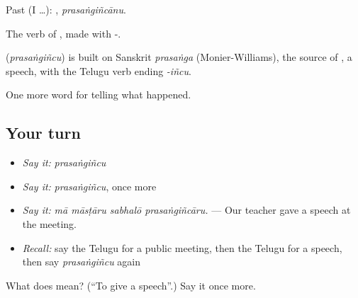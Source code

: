 Past (I …): , \emph{prasaṅgiñcānu}.

The verb of , made with -.

\begin{cousinweb}
\textbf{} (\emph{prasaṅgiñcu}) is built on Sanskrit \emph{prasaṅga} (Monier-Williams), the source of , a speech, with the Telugu verb ending \emph{-iñcu}.
\end{cousinweb}

\begin{grammarlens}[title={What you've built}]
One more word for telling what happened.
\end{grammarlens}

\subsection*{Your turn}
\begin{itemize}
\raggedright
  \item \emph{Say it:} \emph{prasaṅgiñcu}
  \item \emph{Say it:} \emph{prasaṅgiñcu}, once more
  \item \emph{Say it:} \emph{mā māsṭāru sabhalō prasaṅgiñcāru.} — Our teacher gave a speech at the meeting.
  \item \emph{Recall:} say the Telugu for a public meeting, then the Telugu for a speech, then say \emph{prasaṅgiñcu} again
\end{itemize}

\begin{tcolorbox}[breakable,colback=teal!4,colframe=teal!35!black,title={Before you move on}]
What does  mean? (\textquotedblleft{}To give a speech\textquotedblright{}.) Say it once more.
\end{tcolorbox}
